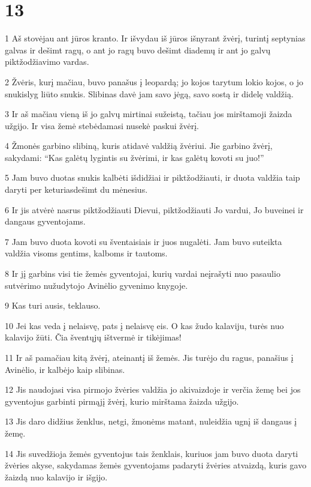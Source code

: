 \chapter{13}


\par 1 Aš stovėjau ant jūros kranto. Ir išvydau iš jūros išnyrant žvėrį, turintį septynias galvas ir dešimt ragų, o ant jo ragų buvo dešimt diademų ir ant jo galvų piktžodžiavimo vardas. 
\par 2 Žvėris, kurį mačiau, buvo panašus į leopardą; jo kojos tarytum lokio kojos, o jo snukis­lyg liūto snukis. Slibinas davė jam savo jėgą, savo sostą ir didelę valdžią. 
\par 3 Ir aš mačiau vieną iš jo galvų mirtinai sužeistą, tačiau jos mirštamoji žaizda užgijo. Ir visa žemė stebėdamasi nusekė paskui žvėrį. 
\par 4 Žmonės garbino slibiną, kuris atidavė valdžią žvėriui. Jie garbino žvėrį, sakydami: “Kas galėtų lygintis su žvėrimi, ir kas galėtų kovoti su juo!” 
\par 5 Jam buvo duotas snukis kalbėti išdidžiai ir piktžodžiauti, ir duota valdžia taip daryti per keturiasdešimt du mėnesius. 
\par 6 Ir jis atvėrė nasrus piktžodžiauti Dievui, piktžodžiauti Jo vardui, Jo buveinei ir dangaus gyventojams. 
\par 7 Jam buvo duota kovoti su šventaisiais ir juos nugalėti. Jam buvo suteikta valdžia visoms gentims, kalboms ir tautoms. 
\par 8 Ir jį garbins visi tie žemės gyventojai, kurių vardai neįrašyti nuo pasaulio sutvėrimo nužudytojo Avinėlio gyvenimo knygoje. 
\par 9 Kas turi ausis, teklauso. 
\par 10 Jei kas veda į nelaisvę, pats į nelaisvę eis. O kas žudo kalaviju, turės nuo kalavijo žūti. Čia šventųjų ištvermė ir tikėjimas! 
\par 11 Ir aš pamačiau kitą žvėrį, ateinantį iš žemės. Jis turėjo du ragus, panašius į Avinėlio, ir kalbėjo kaip slibinas. 
\par 12 Jis naudojasi visa pirmojo žvėries valdžia jo akivaizdoje ir verčia žemę bei jos gyventojus garbinti pirmąjį žvėrį, kurio mirštama žaizda užgijo. 
\par 13 Jis daro didžius ženklus, netgi, žmonėms matant, nuleidžia ugnį iš dangaus į žemę. 
\par 14 Jis suvedžioja žemės gyventojus tais ženklais, kuriuos jam buvo duota daryti žvėries akyse, sakydamas žemės gyventojams padaryti žvėries atvaizdą, kuris gavo žaizdą nuo kalavijo ir išgijo. 
